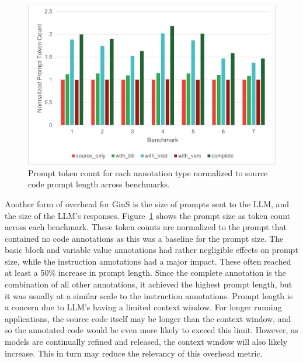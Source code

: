 \documentclass[sigconf,nonacm]{acmart}
\begin{document}
\begin{figure}
    \centering
    \includegraphics[width=1\linewidth]{images/PromptCost.png}
    \caption{Prompt token count for each annotation type normalized to source code prompt length across benchmarks.}
    \label{fig:prompt}
\end{figure}

Another form of overhead for GinS is the size of prompts sent to the LLM, and the size of the LLM's responses.
Figure~\ref{fig:prompt} shows the prompt size as token count across each benchmark.
These token counts are normalized to the prompt that contained no code annotations as this was a baseline for the prompt size.
The basic block and variable value annotations had rather negligible effects on prompt size, while the instruction annotations had a major impact.
These often reached at least a 50\% increase in prompt length.
Since the complete annotation is the combination of all other annotations, it achieved the highest prompt length, but it was usually at a similar scale to the instruction annotations.
Prompt length is a concern due to LLM's having a limited context window.
For longer running applications, the source code itself may be longer than the context window, and so the annotated code would be even more likely to exceed this limit.
However, as models are continually refined and released, the context window will also likely increase.
This in turn may reduce the relevancy of this overhead metric.
\end{document}
